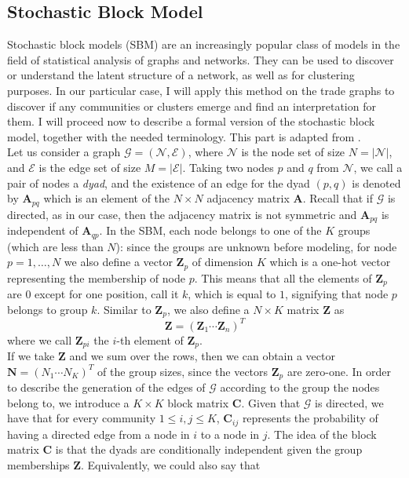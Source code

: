 \subsection{Stochastic Block Model}\label{sec:sbm}
Stochastic block models (SBM) are an increasingly popular class of models in the field of statistical analysis of graphs and networks. They can be used to discover or understand the latent structure of a network, as well as for clustering purposes. In our particular case, I will apply this method on the trade graphs to discover if any communities or clusters emerge and find an interpretation for them.
I will proceed now to describe a formal version of the stochastic block model, together with the needed terminology. This part is adapted from \textcite{lee2019review}.\\
Let us consider a graph $\mathcal{G} = (\mathcal{N},\mathcal{E})$, where $\mathcal{N}$ is the node set of size $N = |\mathcal{N}|$, and $\mathcal{E}$ is the edge set of size $M = |\mathcal{E}|$. Taking two nodes $p$ and $q$ from $\mathcal{N}$, we call a pair of nodes a \textit{dyad}, and the existence of an edge for the dyad $(p,q)$ is denoted by $\mathbf{A}_{pq}$ which is an element of the $N \times N$ adjacency matrix $\mathbf{A}$. Recall that if $\mathcal{G}$ is directed, as in our case, then the adjacency matrix is not symmetric and $\mathbf{A}_{pq}$ is independent of $\mathbf{A}_{qp}$.
In the SBM, each node belongs to one of the $K$ groups (which are less than $N$): since the groups are unknown before modeling, for node $p = 1,\ldots,N$ we also define a vector $\mathbf{Z}_p$ of dimension $K$ which is a one-hot vector representing the membership of node $p$. This means that all the elements of $\mathbf{Z}_{p}$ are $0$ except for one position, call it $k$, which is equal to $1$, signifying that node $p$ belongs to group $k$.
Similar to $\mathbf{Z}_{p}$, we also define a $N \times K$ matrix $\mathbf{Z}$ as
\[
    \mathbf{Z} = (\mathbf{Z}_1 \cdots \mathbf{Z}_n)^T
\]
where we call $\mathbf{Z}_{pi}$ the $i$-th element of $\mathbf{Z}_p$.\\
If we take $\mathbf{Z}$ and we sum over the rows, then we can obtain a vector $\mathbf{N} = (N_1 \cdots N_K)^T$ of the group sizes, since the vectors $\mathbf{Z}_{p}$ are zero-one.
In order to describe the generation of the edges of $\mathcal{G}$ according to the group the nodes belong to, we introduce a $K \times K$ block matrix $\mathbf{C}$. Given that $\mathcal{G}$ is directed, we have that for every community $1 \leq i,j \leq K$, $\mathbf{C}_{ij}$ represents the probability of having a directed edge from a node in $i$ to a node in $j$. The idea of the block matrix $\mathbf{C}$ is that the dyads are conditionally independent given the group memberships $\mathbf{Z}$. Equivalently, we could also say that
